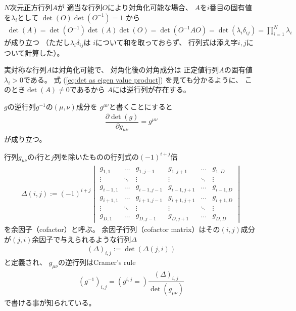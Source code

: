 $N$次元正方行列$A$が
適当な行列$O$により対角化可能な場合、
$A$を$i$番目の固有値を$\lambda_i$として
$\det( O ) \det( O^{-1} ) = 1$
から
\begin{align}
    \det( A )
=
    \det( O^{-1} )
    \det( A )
    \det( O )
=
    \det( O^{-1} A O )
=
    \det( \lambda_i \delta_{ij} )
=
    \prod_{i=1}^N
        \lambda_i
\label{eq:det as eigen value product}
\end{align}
が成り立つ
（ただし$\lambda_i \delta_{ij}$は
$i$について和を取っておらず、
行列式は添え字$i, j$について計算した）。

実対称な行列$A$は対角化可能で、
対角化後の対角成分は
正定値行列$A$の固有値$\lambda_i >0$である。
式
(\ref{eq:det as eigen value product})
を見ても分かるように、
このとき$\det(A) \neq 0$であるから
$A$には逆行列が存在する。

$g$の逆行列$g^{-1}$の$(\mu,\nu)$成分を
$g^{\mu\nu}$と書くことにすると
\begin{align}
    \dfrac{\partial \det(g)}{\partial g_{\mu\nu}}
    =
    g^{\mu\nu}
\end{align}
が成り立つ。

行列$g_{\mu\nu}$の$i$行と$j$列を除いたものの行列式の$(-1)^{i+j}$倍
\begin{align}
    \Delta(i,j) :=
    (-1)^{i+j}
    \begin{vmatrix}
        g_{1,1} & \dots & g_{1,j-1} & g_{1,j+1} & \dots & g_{1,D}
    \\
        \vdots & \ddots & \vdots & \vdots & \ddots & \vdots
    \\
        g_{i-1,1} & \dots & g_{i-1,j-1} & g_{i-1,j+1} & \dots & g_{i-1,D}
    \\
        g_{i+1,1} & \dots & g_{i+1,j-1} & g_{i+1,j+1} & \dots & g_{i+1,D}
    \\
        \vdots & \ddots & \vdots & \vdots & \ddots & \vdots
    \\
        g_{D,1} & \dots & g_{D,j-1} & g_{D,j+1} & \dots & g_{D,D}
    \end{vmatrix}
\end{align}
を余因子（cofactor）と呼ぶ。
余因子行列（cofactor matrix）はその$(i,j)$成分が$(j,i)$余因子で与えられるような行列$\Delta$
\begin{align}
    (\Delta)_{i,j} := \det(\Delta(j,i))
\end{align}
と定義され、
$g_{\mu\nu}$の逆行列はCramer's rule
\begin{align}
    (g^{-1})_{i,j}
    = ( g^{i,j} = )
    \dfrac{ (\Delta)_{i,j} }
    { \det(g_{\mu\nu}) }
\end{align}
で書ける事が知られている。


